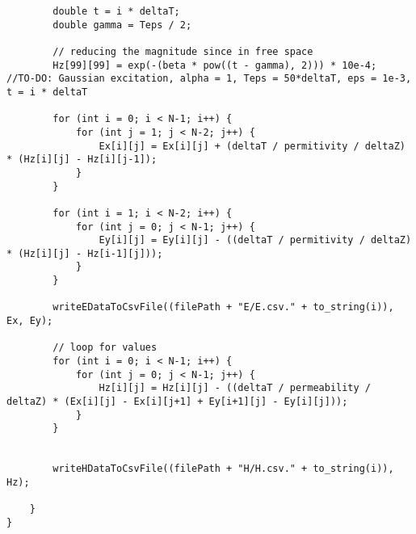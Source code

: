 \begin{verbatim}
		double t = i * deltaT;
		double gamma = Teps / 2;
		
		// reducing the magnitude since in free space
		Hz[99][99] = exp(-(beta * pow((t - gamma), 2))) * 10e-4;  //TO-DO: Gaussian excitation, alpha = 1, Teps = 50*deltaT, eps = 1e-3, t = i * deltaT
		
		for (int i = 0; i < N-1; i++) {
			for (int j = 1; j < N-2; j++) {
				Ex[i][j] = Ex[i][j] + (deltaT / permitivity / deltaZ) * (Hz[i][j] - Hz[i][j-1]);
			}
		}
		
		for (int i = 1; i < N-2; i++) {
			for (int j = 0; j < N-1; j++) {
				Ey[i][j] = Ey[i][j] - ((deltaT / permitivity / deltaZ) * (Hz[i][j] - Hz[i-1][j]));
			}
		}
		
		writeEDataToCsvFile((filePath + "E/E.csv." + to_string(i)), Ex, Ey);
		
		// loop for values
		for (int i = 0; i < N-1; i++) {
			for (int j = 0; j < N-1; j++) {
				Hz[i][j] = Hz[i][j] - ((deltaT / permeability / deltaZ) * (Ex[i][j] - Ex[i][j+1] + Ey[i+1][j] - Ey[i][j]));
			}
		}
		
		
		writeHDataToCsvFile((filePath + "H/H.csv." + to_string(i)), Hz);
		
	}
}
\end{verbatim}


